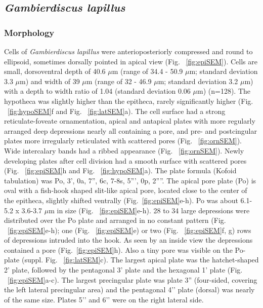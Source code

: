 \documentclass[12pt]{article}
\begin{document}
\subsection{\emph{Gambierdiscus lapillus}}
\subsubsection{Morphology}
Cells of\textit{ Gambierdiscus lapillus} were anterioposteriorly compressed and round to ellipsoid, sometimes dorsally pointed in apical view (Fig. ~\ref{fig:epiSEM}). 
Cells are small, dorsoventral depth of 40.6 $\mu$m (range of 34.4 - 50.9 $\mu$m; standard deviation 3.3 $\mu$m) and width of 39 $\mu$m (range of 32 - 46.9 $\mu$m; standard deviation 3.2 $\mu$m) with a depth to width ratio of 1.04 (standard deviation 0.06 $\mu$m) (n=128). 
The hypotheca was slightly higher than the epitheca, rarely significantly higher (Fig. ~\ref{fig:hypoSEM}f and Fig. ~\ref{fig:latSEM}a).
The cell surface had a strong  reticulate-foveate ornamentation, apical and antapical plates with more regularly arranged deep depressions nearly all containing a pore, and pre- and postcingular plates more irregularly reticulated with scattered pores (Fig. ~\ref{fig:ornSEM}). 
Wide intercalary bands had a ribbed appearance (Fig. ~\ref{fig:ornSEM}). 
Newly developing plates after cell division had a smooth surface with scattered pores (Fig. ~\ref{fig:epiSEM}h and Fig. ~\ref{fig:hypoSEM}a). 
The plate formula (Kofoid tabulation) was Po, 3', 0a, 7'', 6c, 7-8s, 5''', 0p, 2''''. 
The apical pore plate (Po) is oval with a fish-hook shaped slit-like apical pore, located close to the center of the epitheca, slightly shifted ventrally (Fig.~\ref{fig:epiSEM}e-h). 
Po was about 6.1-5.2 x 3.6-3.7 $\mu$m in size (Fig. ~\ref{fig:epiSEM}e-h). 
28 to 34 large depressions were distributed over the Po plate and arranged in no constant pattern (Fig. ~\ref{fig:epiSEM}e-h); one (Fig. ~\ref{fig:epiSEM}e) or two (Fig. ~\ref{fig:epiSEM}f, g) rows of depressions intruded into the hook. 
As seen by an inside view the depressions contained a pore (Fig.~\ref{fig:epiSEM}h). Also a tiny pore was visible on the Po-plate (suppl. Fig. ~\ref{fig:latSEM}c). 
The largest apical plate was the hatchet-shaped 2' plate, followed by the pentagonal 3' plate and the hexagonal 1' plate (Fig. ~\ref{fig:epiSEM}a-c). The largest precingular plate was plate 3'' (four-sided, covering the left lateral precingular area) and the pentagonal 4’’ plate (dorsal) was nearly of the same size. Plates 5’’ and 6’’ were on the right lateral side. 
\end{document}
